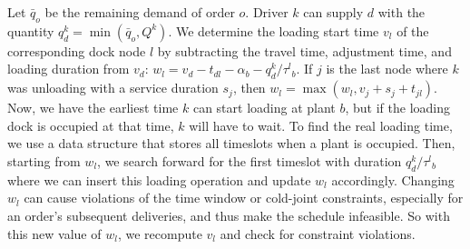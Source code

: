 \documentclass[]{article}
\begin{document}
Let $\bar{q}_o$ be the remaining demand of order $o$. Driver $k$ can supply $d$ with the quantity $q^k_d= \min(\bar{q}_o,Q^k)$. We determine the loading start time $v_l$ of the corresponding dock node $l$ by subtracting the travel time, adjustment time, and loading duration from $v_d$: $w_l = v_d - t_{dl} - \alpha_b - q^k_{d}/\tau^l{_b} $. If $j$ is the last node where $k$ was unloading with a service duration $s_j$, then $w_l= \max(w_l, v_j + s_{j} + t_{jl})$. Now, we have the earliest time $k$ can start loading at plant $b$, but if the loading dock is occupied at that time, $k$ will have to wait. To find the real loading time, we use a data structure that stores all timeslots when a plant is occupied. Then, starting from $w_l$, we search forward for the first timeslot with duration $q^k_{d}/\tau^l{_b}$ where we can insert this loading operation and update $w_l$ accordingly. Changing $w_l$ can cause violations of the time window or cold-joint constraints, especially for an order's subsequent deliveries, and thus make the schedule infeasible. So with this new value of $w_l$, we recompute $v_l$ and check for constraint violations.
\end{document}
